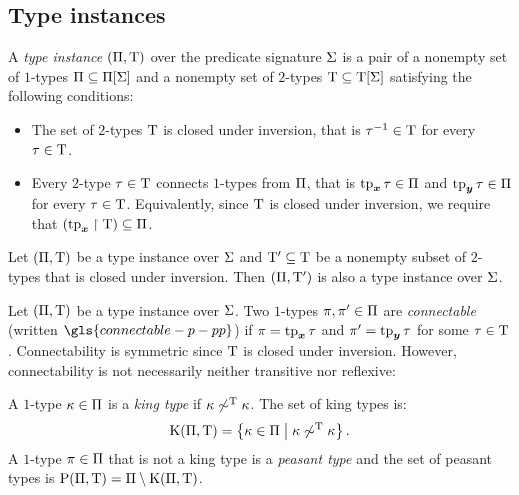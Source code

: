 \subsection{Type instances}
\begin{definition}\label{def:tpinst-twovar}
A \emph{type instance} $(\Pi,\mathrm{T})$ over the predicate signature $\mathrm{\Sigma}$ is
a pair of a nonempty set of $1$-types $\Pi\subseteq\Pi[\mathrm{\Sigma}]$ and a nonempty set of $2$-types
$\mathrm{T}\subseteq\mathrm{T}[\mathrm{\Sigma}]$ satisfying the following conditions:
\begin{itemize}
  \item[\condtpii]\label{cond:tpii}
  The set of $2$-types $\mathrm{T}$ is closed under inversion, that is
  $\tau^{-1}\in\mathrm{T}$ for every $\tau\in\mathrm{T}$.
  \item[\condtpic]\label{cond:tpic}
  Every $2$-type $\tau\in\mathrm{T}$ connects $1$-types
  from $\Pi$, that is $\operatorname{tp}_{\bm{x}}\tau\in\Pi$ and $\operatorname{tp}_{\bm{y}}\tau\in\Pi$ for every
  $\tau\in\mathrm{T}$.
  Equivalently, since $\mathrm{T}$ is closed under inversion,
  we require that $(\operatorname{tp}_{\bm{x}}\restriction\mathrm{T})\subseteq\Pi$.
\end{itemize}
\end{definition}
\begin{remark}\label{rem:tpi-sub}
Let $(\Pi,\mathrm{T})$ be a type instance over $\mathrm{\Sigma}$ and
${\mathrm{T}'} \subseteq \mathrm{T}$ be a nonempty subset of $2$-types that is closed 
under inversion. Then $(\Pi,{\mathrm{T}'})$ is also a type instance over $\mathrm{\Sigma}$.
\end{remark}

\begin{definition}\label{def:connectable}
Let $(\Pi,\mathrm{T})$ be a type instance over $\mathrm{\Sigma}$.
Two $1$-types $\pi, {\pi'} \in \Pi$ are \emph{connectable} 
(written $\gls{connectable-p-pp}$)
if $\pi = \operatorname{tp}_{\bm{x}}\tau$ and ${\pi'} = \operatorname{tp}_{\bm{y}}\tau$ for some $\tau \in \mathrm{T}$.
Connectability is symmetric since $\mathrm{T}$ is closed under inversion.
However, connectability is not necessarily neither transitive nor reflexive:

A $1$-type $\kappa \in \Pi$ is a \emph{king type} if 
$\kappa \not\sim^{\mathrm{T}}\kappa$. 
The set of king types is:
\[
  \mathrm{K}(\Pi,\mathrm{T}) = \left\{\kappa\in\Pi\mathrel{}\middle|\mathrel{}\kappa \not\sim^{\mathrm{T}} \kappa\right\}.
\]
A $1$-type $\pi \in \Pi$ that is not a king type is a \emph{peasant type}
and the set of peasant types is $\mathrm{P}(\Pi,\mathrm{T}) = \Pi \setminus
\mathrm{K}(\Pi,\mathrm{T})$.
\end{definition}

